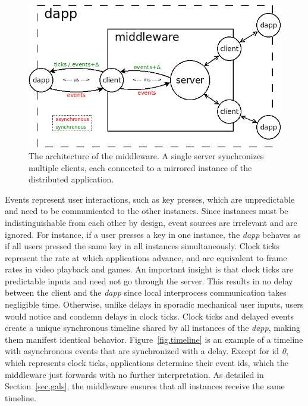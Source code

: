 \documentclass[sigplan,screen]{acmart}
\newcommand{\dapp}{\emph{dapp}\xspace}
\begin{document}
\begin{figure}[t]
  \centering
  \includegraphics[width=\linewidth]{middleware}
  \caption{
    \label{fig.middleware}
    The architecture of the middleware.
    A single server synchronizes multiple clients, each connected to a mirrored
    instance of the distributed application.
  }
\end{figure}

Events represent user interactions, such as key presses, which are
unpredictable and need to be communicated to the other instances.
Since instances must be indistinguishable from each other by design, event
sources are irrelevant and are ignored.
For instance, if a user presses a key in one instance, the \dapp behaves as if
all users pressed the same key in all instances simultaneously.
%
Clock ticks represent the rate at which applications advance, and are
equivalent to frame rates in video playback and games.
An important insight is that clock ticks are predictable inputs and need not go
through the server.
This results in no delay between the client and the \dapp since local
interprocess communication takes negligible time.
Otherwise, unlike delays in sporadic mechanical user inputs, users would notice
and condemn delays in clock ticks.
%
Clock ticks and delayed events create a unique synchronous timeline shared by
all instances of the \dapp, making them manifest identical behavior.
Figure~\ref{fig.timeline} is an example of a timeline with asynchronous events
that are synchronized with a delay.
Except for id \emph{0}, which represents clock ticks, applications determine
their event ids, which the middleware just forwards with no further
interpretation.
As detailed in Section~\ref{sec.gals}, the middleware ensures that all
instances receive the same timeline.
\end{document}
